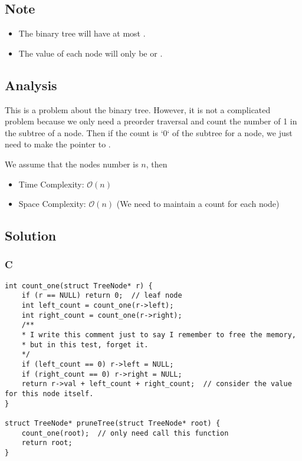 \subsection*{Note}
\begin{itemize}
\item The binary tree will have at most .
\item The value of each node will only be  or .
\end{itemize}

\subsection*{Analysis}
This is a problem about the binary tree. However, it is not a complicated problem because we only need a preorder traversal and count the number of 1 in the subtree of a node. Then if the count is `0` of the subtree for a node, we just need to make the pointer to .

We assume that the nodes number is $n$, then
\begin{itemize}
\item Time Complexity: $\mathcal{O}(n)$
\item Space Complexity: $\mathcal{O}(n)$ (We need to maintain a count for each node)
\end{itemize}

\subsection*{Solution}
\subsubsection*{C}
\begin{verbatim}
int count_one(struct TreeNode* r) {
    if (r == NULL) return 0;  // leaf node
    int left_count = count_one(r->left);
    int right_count = count_one(r->right);
    /**
    * I write this comment just to say I remember to free the memory,
    * but in this test, forget it.
    */
    if (left_count == 0) r->left = NULL;
    if (right_count == 0) r->right = NULL;
    return r->val + left_count + right_count;  // consider the value for this node itself.
}

struct TreeNode* pruneTree(struct TreeNode* root) {
    count_one(root);  // only need call this function
    return root;
}
\end{verbatim}

\newpage

